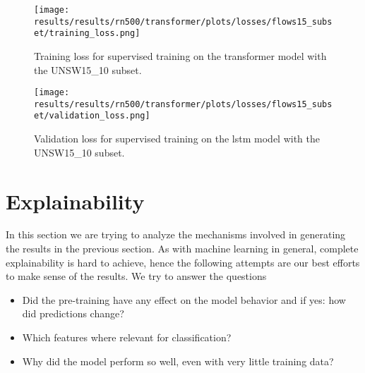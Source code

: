 











\begin{figure}[!htbp]
	\centering
	\texttt{[image: results/results/rn500/transformer/plots/losses/flows15\_subset/training\_loss.png]}
	\caption{Training loss for supervised training on the transformer model with the UNSW15\_10 subset.}
	\label{fig:results:transformer:training_loss_flows15_subset}
\end{figure}

\begin{figure}[!htbp]
	\centering
	\texttt{[image: results/results/rn500/transformer/plots/losses/flows15\_subset/validation\_loss.png]}
	\caption{Validation loss for supervised training on the \gls{lstm} model with the UNSW15\_10 subset.}
	\label{fig:results:transformer:validation_loss_flows15_subset}
\end{figure}


\section{Explainability}

In this section we are trying to analyze the mechanisms involved in generating the results in the previous section. As with machine learning in general, complete explainability is hard to achieve, hence the following attempts are our best efforts to make sense of the results. We try to answer the questions

\begin{itemize}
	\item Did the pre-training have any effect on the model behavior and if yes: how did predictions change?
	\item Which features where relevant for classification? 
	\item Why did the model perform so well, even with very little training data?
\end{itemize}

